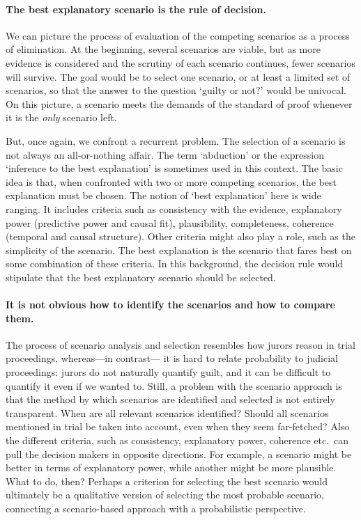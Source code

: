 \documentclass[10pt]{article}
\begin{document}
\paragraph{The best explanatory scenario is the rule of decision.}

We can picture the process of evaluation of the competing scenarios as a process of elimination. 
At the beginning, several scenarios are viable, but as more evidence is considered and the scrutiny of each scenario continues,
fewer scenarios will survive. The goal would be to select one scenario, or at least a limited set of scenarios, so that 
the answer to the question `guilty or not?' would be univocal. On this picture, a scenario meets the demands of the standard 
of proof whenever it is the \textit{only} scenario left.

But, once again, we confront a recurrent problem. The selection of a scenario is not always an all-or-nothing affair.
The term `abduction' or the expression `inference to the best explanation' is sometimes used in this context. The basic idea is that, when confronted 
with two or more competing scenarios, the best explanation must be chosen. The notion of `best explanation' here is wide ranging. It includes criteria such as 
consistency with the evidence, explanatory power (predictive power and causal fit), plausibility, completeness, coherence (temporal and causal structure). 
Other criteria might also play a role, such as the simplicity of the scenario. The best explanation is the scenario that fares 
best on some combination of these criteria. %
In this background, the decision rule would stipulate that 
the best explanatory scenario %
should be selected. 


\paragraph{It is not obvious how to identify the scenarios and how to compare them.}

The process of scenario analysis and selection resembles how jurors reason in trial proceedings, whereas---in contrast---%
it is hard to relate probability to judicial proceedings: jurors do not 
naturally quantify guilt, and it can be difficult to quantify it even if we wanted to. Still, a problem with the scenario approach is that 
the method by which scenarios are identified and selected is not entirely transparent. When are all relevant scenarios identified? Should all scenarios mentioned in trial be taken into account, even when they seem far-fetched? Also the different criteria, such as consistency, explanatory power, coherence etc.\ 
can pull the decision makers in opposite directions. For example, a scenario might be better in terms of explanatory power, while another might 
be more plausible. What to do, then? Perhaps a criterion for selecting the best scenario would ultimately be a qualitative version of selecting the most probable scenario, connecting a scenario-based approach with a probabilistic perspective. 
\end{document}
